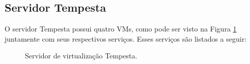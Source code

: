 \subsection{Servidor Tempesta}
\label{section:serv_tempesta}

O servidor Tempesta possui quatro \ac{VM}s, como pode ser visto na Figura \ref{fig:servidor_tempesta} juntamente com seus respectivos serviços. 
Esses serviços são listados a seguir:

\begin{figure}[h!]
 \centering
 \caption{Servidor de virtualização Tempesta.}
 \label{fig:servidor_tempesta}
\end{figure}

